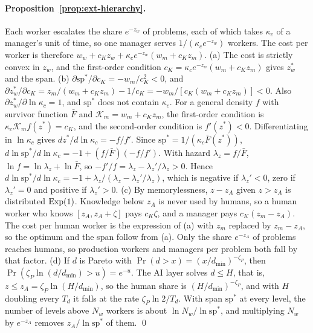 \paragraph{Proposition~\ref{prop:ext-hierarchy}.} Each worker escalates the share $e^{-z_w}$ of problems, each of which takes $\kappa_c$ of a manager's unit of time, so one manager serves $1/(\kappa_ce^{-z_w})$ workers. The cost per worker is therefore $w_w+c_Kz_w+\kappa_ce^{-z_w}(w_m+c_Kz_m)$.
(a) The cost is strictly convex in $z_w$, and the first-order condition $c_K=\kappa_ce^{-z_w}(w_m+c_Kz_m)$ gives $z_w^*$ and the span.
(b) $\partial\mathrm{sp}^*/\partial c_K=-w_m/c_K^2<0$, and $\partial z^*_w/\partial c_K=z_m/(w_m+c_Kz_m)-1/c_K=-w_m/[c_K(w_m+c_Kz_m)]<0$. Also $\partial z^*_w/\partial\ln\kappa_c=1$, and $\mathrm{sp}^*$ does not contain $\kappa_c$. For a general density $f$ with survivor function $\bar F$ and $\mathcal K_m=w_m+c_Kz_m$, the first-order condition is $\kappa_c\mathcal K_mf(z^*)=c_K$, and the second-order condition is $f'(z^*)<0$. Differentiating in $\ln\kappa_c$ gives $dz^*/d\ln\kappa_c=-f/f'$. Since $\mathrm{sp}^*=1/(\kappa_c\bar F(z^*))$, $d\ln\mathrm{sp}^*/d\ln\kappa_c=-1+(f/\bar F)(-f/f')$. With hazard $\lambda_z=f/\bar F$, $\ln f=\ln\lambda_z+\ln\bar F$, so $-f'/f=\lambda_z-\lambda_z'/\lambda_z>0$. Hence $d\ln\mathrm{sp}^*/d\ln\kappa_c=-1+\lambda_z/(\lambda_z-\lambda_z'/\lambda_z)$, which is negative if $\lambda_z'<0$, zero if $\lambda_z'=0$ and positive if $\lambda_z'>0$.
(c) By memorylessness, $z-z_A$ given $z>z_A$ is distributed ${\rm Exp}(1)$. Knowledge below $z_A$ is never used by humans, so a human worker who knows $[z_A,z_A+\zeta]$ pays $c_K\zeta$, and a manager pays $c_K(z_m-z_A)$. The cost per human worker is the expression of (a) with $z_m$ replaced by $z_m-z_A$, so the optimum and the span follow from (a). Only the share $e^{-z_A}$ of problems reaches humans, so production workers and managers per problem both fall by that factor.
(d) If $d$ is Pareto with $\Pr(d>x)=(x/d_{\min})^{-\zeta_P}$, then $\Pr(\zeta_P\ln(d/d_{\min})>u)=e^{-u}$. The AI layer solves $d\le H$, that is, $z\le z_A=\zeta_P\ln(H/d_{\min})$, so the human share is $(H/d_{\min})^{-\zeta_P}$, and with $H$ doubling every $T_d$ it falls at the rate $\zeta_P\ln2/T_d$. With span $\mathrm{sp}^*$ at every level, the number of levels above $N_w$ workers is about $\ln N_w/\ln\mathrm{sp}^*$, and multiplying $N_w$ by $e^{-z_A}$ removes $z_A/\ln\mathrm{sp}^*$ of them. \qed

